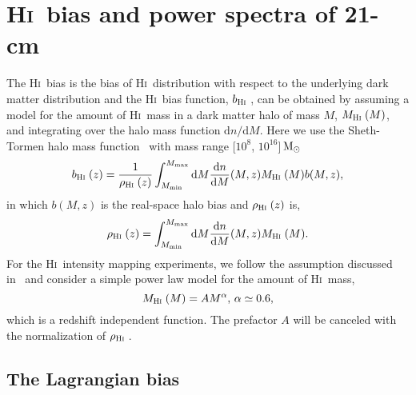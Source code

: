 \documentclass[twocolumn,floatfix,nofootinbib,aps,reprint]{revtex4}
\def\hi{\textsc{Hi~}}
\begin{document}
\section{\hi bias and power spectra of 21-cm}
\label{sec:bhi}
The \hi bias is the bias of \hi distribution with respect to the 
underlying dark matter distribution
and the \hi bias function, $b_\mathrm{\hi}$, can be obtained by  assuming 
a model for the amount of \hi mass in a dark matter halo of mass $M$,
$M_\mathrm{\hi}(M)$, and integrating 
over the halo mass function $\mathrm{d}n/\mathrm{d}M$. Here we use the Sheth-Tormen halo mass function~\cite{Sheth02} with mass range [$10^{8}$, $10^{16}$]\,${\rm M}_{\odot}$
\begin{equation}\label{eq:b}
    b_\mathrm{\hi}(z) = \frac{1}{\rho_\mathrm{\hi}(z)} 
    \int^{M_\mathrm{max}}_{M_\mathrm{min}} \mathrm{d}M 
    \frac{\mathrm{d}n}{\mathrm{d}M}(M, z)
    M_\mathrm{\hi}(M) b(M, z),
\end{equation}
in which $b(M, z)$ is the real-space halo bias and $\rho_\mathrm{\hi}(z)$ is,
\begin{equation}\label{eq:rho}
    \rho_\mathrm{\hi}(z) = 
    \int^{M_\mathrm{max}}_{M_\mathrm{min}} \mathrm{d}M 
    \frac{\mathrm{d}n}{\mathrm{d}M}(M, z)
    M_\mathrm{\hi}(M) .
\end{equation}
For the \hi intensity mapping experiments, we follow the assumption 
discussed in~\cite{2015aska.confE..19S} and consider a simple power 
law model for the amount of \hi mass,
\begin{equation}
    M_\mathrm{\hi}(M) = AM^\alpha, \, \alpha \simeq 0.6,
\end{equation}
which is a redshift independent function.
The prefactor $A$ will be canceled with the normalization of 
$\rho_\mathrm{\hi}$.

\subsection{The Lagrangian bias}
\end{document}
